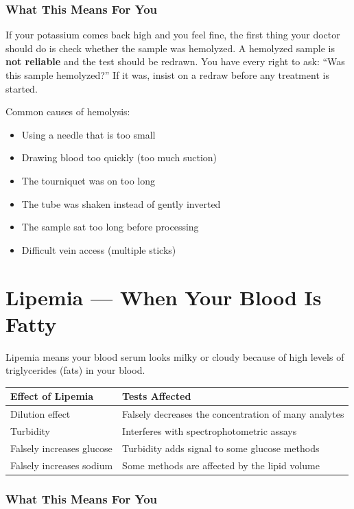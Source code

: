 \subsubsection{What This Means For You}

If your potassium comes back high and you feel fine, the first thing your doctor should do is check whether the sample was hemolyzed. A hemolyzed sample is \textbf{not reliable} and the test should be redrawn. You have every right to ask: ``Was this sample hemolyzed?'' If it was, insist on a redraw before any treatment is started.

Common causes of hemolysis:
\begin{itemize}
    \item Using a needle that is too small
    \item Drawing blood too quickly (too much suction)
    \item The tourniquet was on too long
    \item The tube was shaken instead of gently inverted
    \item The sample sat too long before processing
    \item Difficult vein access (multiple sticks)
\end{itemize}

\clearpage
\section{Lipemia --- When Your Blood Is Fatty}

Lipemia means your blood serum looks milky or cloudy because of high levels of triglycerides (fats) in your blood.

\begin{longtable}{@{}p{4.5cm}p{10.5cm}@{}}
\toprule
\textbf{Effect of Lipemia} & \textbf{Tests Affected} \\
\midrule
Dilution effect & Falsely decreases the concentration of many analytes \\
Turbidity & Interferes with spectrophotometric assays \\
Falsely increases glucose & Turbidity adds signal to some glucose methods \\
Falsely increases sodium & Some methods are affected by the lipid volume \\
\bottomrule
\end{longtable}

\subsubsection{What This Means For You}

